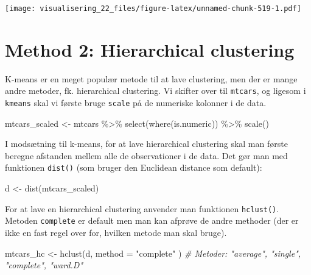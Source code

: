 \documentclass[
]{book}
\newenvironment{Shaded}{\begin{snugshade}}{\end{snugshade}}
\newcommand{\AttributeTok}[1]{\textcolor[rgb]{0.77,0.63,0.00}{#1}}
\newcommand{\CommentTok}[1]{\textcolor[rgb]{0.56,0.35,0.01}{\textit{#1}}}
\newcommand{\FunctionTok}[1]{\textcolor[rgb]{0.00,0.00,0.00}{#1}}
\newcommand{\NormalTok}[1]{#1}
\newcommand{\OtherTok}[1]{\textcolor[rgb]{0.56,0.35,0.01}{#1}}
\newcommand{\SpecialCharTok}[1]{\textcolor[rgb]{0.00,0.00,0.00}{#1}}
\newcommand{\StringTok}[1]{\textcolor[rgb]{0.31,0.60,0.02}{#1}}
\begin{document}
\texttt{[image: visualisering\_22\_files/figure-latex/unnamed-chunk-519-1.pdf]}

\hypertarget{method-2-hierarchical-clustering}{%
\section{Method 2: Hierarchical clustering}\label{method-2-hierarchical-clustering}}

K-means er en meget populær metode til at lave clustering, men der er mange andre metoder, fk. hierarchical clustering. Vi skifter over til \texttt{mtcars}, og ligesom i \texttt{kmeans} skal vi første bruge \texttt{scale} på de numeriske kolonner i de data.

\begin{Shaded}
\begin{Highlighting}[]
\NormalTok{mtcars\_scaled }\OtherTok{\textless{}{-}}\NormalTok{ mtcars }\SpecialCharTok{\%\textgreater{}\%} \FunctionTok{select}\NormalTok{(}\FunctionTok{where}\NormalTok{(is.numeric)) }\SpecialCharTok{\%\textgreater{}\%} \FunctionTok{scale}\NormalTok{()}
\end{Highlighting}
\end{Shaded}

I modsætning til k-means, for at lave hierarchical clustering skal man første beregne afstanden mellem alle de observationer i de data. Det gør man med funktionen \texttt{dist()} (som bruger den Euclidean distance som default):

\begin{Shaded}
\begin{Highlighting}[]
\NormalTok{d }\OtherTok{\textless{}{-}} \FunctionTok{dist}\NormalTok{(mtcars\_scaled)}
\end{Highlighting}
\end{Shaded}

For at lave en hierarchical clustering anvender man funktionen \texttt{hclust()}. Metoden \texttt{complete} er default men man kan afprøve de andre methoder (der er ikke en fast regel over for, hvilken metode man skal bruge).

\begin{Shaded}
\begin{Highlighting}[]
\NormalTok{mtcars\_hc }\OtherTok{\textless{}{-}} \FunctionTok{hclust}\NormalTok{(d, }\AttributeTok{method =} \StringTok{"complete"}\NormalTok{ )}
\CommentTok{\# Metoder: "average", "single", "complete", "ward.D"}
\end{Highlighting}
\end{Shaded}
\end{document}
